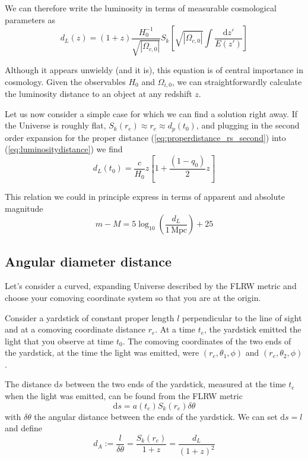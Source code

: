 \par We can therefore write the luminosity in terms of measurable cosmological parameters as 
\begin{equation}
    \boxed{
    d_{L}(z) = (1+z)\frac{H_{0}^{-1}}{\sqrt{|\Omega_{c,0}|}}S_{k}\left[\sqrt{|\Omega_{c,0}|}\int \frac{\text{d}z'}{E(z')}\right]
    }
    \label{eq:general_lumdist}
\end{equation}
\par Although it appears unwieldy (and it is), this equation is of central importance in cosmology. Given the observables $H_{0}$ and $\Omega_{i,0}$, we can straightforwardly calculate the luminosity distance to an object at any redshift $z$.
\par Let us now consider a simple case for which we can find a solution right away. If the Universe is roughly flat, $S_{k}(r_{e}) \approx r_{e} \approx d_{p}(t_{0})$, and plugging in the second order expansion for the proper distance (\ref{eq:properdistance_rs_second}) into (\ref{eq:luminositydistance}) we find
\begin{equation}
    d_{L}(t_{0}) = \frac{c}{H_{0}}z\left[1+\frac{(1-q_{0})}{2}z\right]
    \label{eq:lumdistance_rs_second}
\end{equation}
\par This relation we could in principle express in terms of apparent and absolute magnitude
\begin{equation*}
    m-M = 5\log_{10}\left(\frac{d_{L}}{1\,\text{Mpc}}\right)+25
\end{equation*}

\subsection{Angular diameter distance}

\par Let's consider a curved, expanding Universe described by the FLRW metric and choose your comoving coordinate system so that you are at the origin.
\par Consider a yardstick of constant proper length $l$ perpendicular to the line of sight and at a comoving coordinate distance $r_{e}$. At a time $t_{e}$, the yardstick emitted the light that you observe at time $t_{0}$. The comoving coordinates of the two ends of the yardstick, at the time the light was emitted, were $(r_{e},\theta_{1},\phi)$ and
$(r_{e},\theta_{2},\phi)$.
\par The distance $\text{d}s$ between the two ends of the yardstick, measured at the time $t_{e}$ when the light was emitted, can be found from the FLRW metric
\begin{equation*}
    \text{d}s = a(t_{e})S_{k}(r_{e})\delta\theta
\end{equation*}
with $\delta\theta$ the angular distance between the ends of the yardstick. We can set $\text{d}s = l$ and define
\begin{equation}
    d_{A} := \frac{l}{\delta\theta} = \frac{S_{k}(r_{e})}{1+z} = \frac{d_{L}}{(1+z)^{2}}
    \label{eq:angulardistance}
\end{equation}

